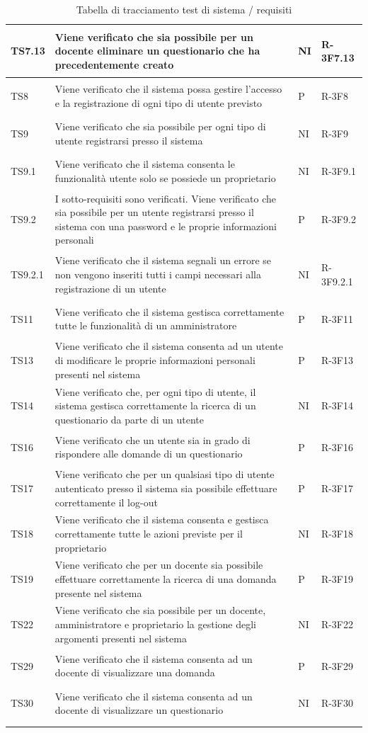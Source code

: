 \documentclass[12pt,a4paper]{article}
\begin{document}
\begin{longtable}{l p{10cm} l l}
		\midrule
		TS7.13 & Viene verificato che sia possibile per un docente eliminare un questionario che ha precedentemente creato & NI & \hypertarget{R-3F7.13}{R-3F7.13}\tabularnewline
		\midrule
		TS8 & Viene verificato che il sistema possa gestire l'accesso e la registrazione di ogni tipo di utente previsto & P& \hypertarget{R-3F8}{R-3F8}\tabularnewline
		\midrule
		TS9 & Viene verificato che sia possibile per ogni tipo di utente registrarsi presso il sistema & NI & \hypertarget{R-3F9}{R-3F9}\tabularnewline
		\midrule
		TS9.1 & Viene verificato che il sistema consenta le funzionalità utente solo se possiede un proprietario & NI & \hypertarget{R-3F9.1}{R-3F9.1}\tabularnewline
		\midrule
		TS9.2 & I sotto-requisiti sono verificati. Viene verificato che sia possibile per un utente registrarsi presso il sistema con una password e le proprie informazioni personali & P& \hypertarget{R-3F9.2}{R-3F9.2}\tabularnewline
		\midrule
		TS9.2.1 & Viene verificato che il sistema segnali un errore se non vengono inseriti tutti i campi necessari alla registrazione di un utente & NI & \hypertarget{R-3F9.2.1}{R-3F9.2.1}\tabularnewline
		\midrule
		TS11 & Viene verificato che il sistema gestisca correttamente tutte le funzionalità di un amministratore & P& \hypertarget{R-3F11}{R-3F11}\tabularnewline
		\midrule
		TS13 & Viene verificato che il sistema consenta ad un utente di modificare le proprie informazioni personali presenti nel sistema & P& \hypertarget{R-3F13}{R-3F13}\tabularnewline
		\midrule
		TS14 & Viene verificato che, per ogni tipo di utente, il sistema gestisca correttamente la ricerca di un questionario da parte di un utente & NI & \hypertarget{R-3F14}{R-3F14}\tabularnewline
		\midrule
		TS16 & Viene verificato che un utente sia in grado di rispondere alle domande di un questionario & P& \hypertarget{R-3F16}{R-3F16}\tabularnewline
		\midrule
		TS17 & Viene verificato che per un qualsiasi tipo di utente autenticato presso il sistema sia possibile effettuare correttamente il log-out  & P& \hypertarget{R-3F17}{R-3F17}\tabularnewline
		\midrule
		TS18 & Viene verificato che il sistema consenta e gestisca correttamente tutte le azioni previste per il proprietario & NI & \hypertarget{R-3F18}{R-3F18}\tabularnewline
		\midrule
		TS19 & Viene verificato che per un docente sia possibile effettuare correttamente la ricerca di una domanda presente nel sistema & P& \hypertarget{R-3F19}{R-3F19}\tabularnewline
		\midrule
		TS22 & Viene verificato che sia possibile per un docente, amministratore e proprietario la gestione degli argomenti presenti nel sistema & NI & \hypertarget{R-3F22}{R-3F22}\tabularnewline
		\midrule
		TS29 & Viene verificato che il sistema consenta ad un docente di visualizzare una domanda & P& \hypertarget{R-3F29}{R-3F29}\tabularnewline
		\midrule
		TS30 & Viene verificato che il sistema consenta ad un docente di visualizzare un questionario & NI & \hypertarget{R-3F30}{R-3F30}\tabularnewline 	\midrule 
		\caption{Tabella di tracciamento test di sistema / requisiti} \tabularnewline
	\end{longtable}
	
\end{document}
